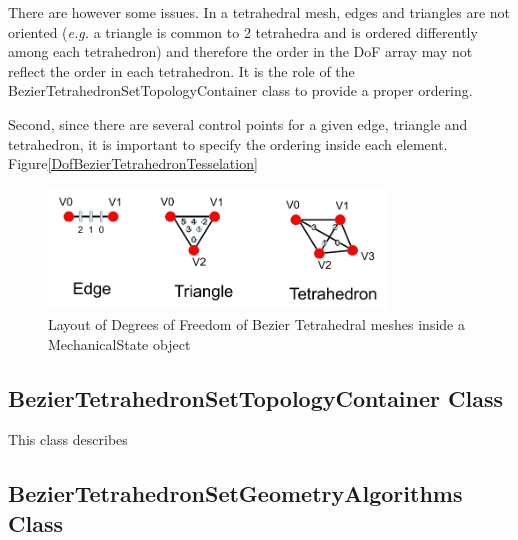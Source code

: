\documentclass[a4paper,11pt]{article}
\begin{document}
There are however some issues. In a tetrahedral mesh, edges and triangles are not oriented ({\em e.g.} a triangle is common to 2 tetrahedra and is ordered differently among each tetrahedron) and therefore the order in the DoF array may not reflect the order in each tetrahedron. It is the role of the BezierTetrahedronSetTopologyContainer class to provide a proper ordering.

Second, since there are several control points for a given edge, triangle and tetrahedron, it is important to specify the ordering inside each element. Figure\ref{DofBezierTetrahedronTesselation}

\begin{figure}[!htbp]
	\centering
    \includegraphics[width=0.80\textwidth]{DofBezierTetrahedronTesselation}
	\caption{Layout of Degrees of Freedom of Bezier Tetrahedral meshes inside a MechanicalState object}
	\label{fig:LayoutBezierTetrahedron}
\end{figure}

\subsection{BezierTetrahedronSetTopologyContainer Class}

This class describes 

\subsection{BezierTetrahedronSetGeometryAlgorithms Class}
\end{document}
